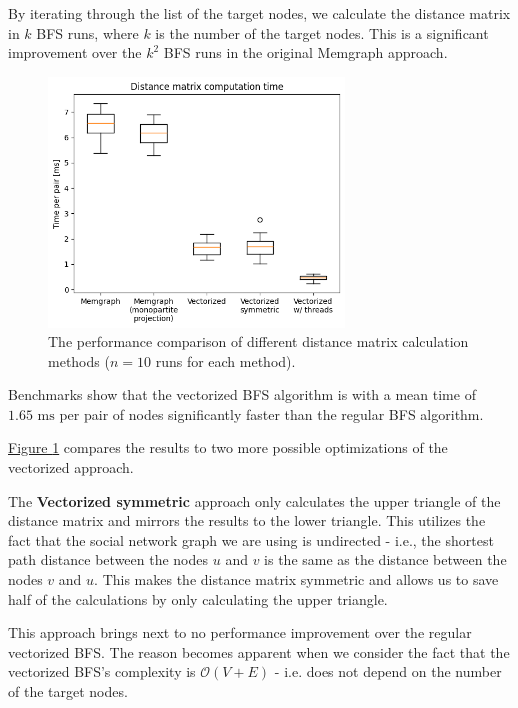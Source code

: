 By iterating through the list of the target nodes, we calculate the distance matrix in $k$ BFS runs, where $k$ is the number of the target nodes.
This is a significant improvement over the $k^2$ BFS runs in the original Memgraph approach.

\begin{figure}[ht!]
    \captionsetup{width=.9\linewidth}
    \includegraphics[width=0.7\textwidth]{../img/identity_inferrence_distance_matrix.png}
    \centering
    \caption{The performance comparison of different distance matrix calculation methods ($n = 10$ runs for each method).}
    \label{fig:identity-inferrence-benchmarks}
\end{figure}

Benchmarks show that the vectorized BFS algorithm is with a mean time of $1.65\text{ ms}$ per pair of nodes significantly faster than the regular BFS algorithm.

\hyperref[fig:identity-inferrence-benchmarks]{Figure \ref*{fig:identity-inferrence-benchmarks}} compares the results to two more possible optimizations of the vectorized approach.

The \textbf{Vectorized symmetric} approach only calculates the upper triangle of the distance matrix and mirrors the results to the lower triangle.
This utilizes the fact that the social network graph we are using is undirected - i.e., the shortest path distance between the nodes $u$ and $v$ is the same as the distance between the nodes $v$ and $u$.
This makes the distance matrix symmetric and allows us to save half of the calculations by only calculating the upper triangle.

This approach brings next to no performance improvement over the regular vectorized BFS.
The reason becomes apparent when we consider the fact that the vectorized BFS's complexity is $\mathcal{O}(V + E)$ - i.e. does not depend on the number of the target nodes.

